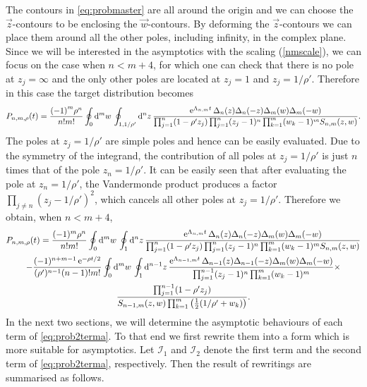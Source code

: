 \documentclass[cmp]{svjour}
\numberwithin{theorem}{section}
\numberwithin{equation}{section}
\DeclareMathOperator{\e}{e}
\def\dd{{\rm d}}
\begin{document}
The contours in \eqref{eq:probmaster} are all around the origin and we can choose the $\vec{z}$-contours to be enclosing the $\vec{w}$-contours. By deforming the $\vec{z}$-contours we can place them around all the other poles, including infinity, in the complex plane. Since we will be interested in the asymptotics with the scaling 
(\ref{nmscale}), we can focus on the case 
when $n<m+4$, for which one can check that there is no pole at $z_j=\infty$ and the only other poles are located at $z_j=1$ and $z_j=1/\rho'$. Therefore in this case 
the target distribution becomes
\begin{align*}
P_{n,m,\rho}(t)  =  \frac{ {(-1)}^m \rho^n  }{n!m!}\oint_{ 0} \dd^m w\,  \oint_{1,1/\rho'} \dd^nz\,  \frac{  \e^{\Lambda_{n,m} t} \Delta_n(z)  \Delta_n(-z)  \Delta_m(w) \Delta_m(-w)}  
{\prod_{j=1}^n (1- \rho' z_j)   \prod_{j=1}^n (z_j-1)^{n} \prod_{k=1}^m (w_k-1)^{m} S_{n,m}(z,w) }.
\end{align*}
%
The poles at $z_j=1/\rho'$ are simple poles and hence can be easily evaluated. Due to the symmetry of the integrand, the contribution of all poles at $z_j=1/\rho'$ is just $n$ times that of the pole $z_n=1/\rho'$. It can be easily seen that after evaluating the pole at $z_n=1/\rho'$, the Vandermonde product produces a factor $\prod_{j\neq n}(z_j-1/\rho')^2$, which cancels all other poles at $z_j=1/\rho'$. Therefore we obtain, when $n<m+4$, 
%
\begin{multline}
\label{eq:prob2terma}
P_{n,m,\rho}(t)  = \frac{ (-1)^m \rho^n  }{n!m!}\oint_{ 0} \dd^m w\,  \oint_{1} \dd^n z\,  \frac{ \e^{\Lambda_{n,m} t} \Delta_n(z) \Delta_n(-z) \Delta_m(w) \Delta_m(-w)} 
{  \prod_{j=1}^n (1- \rho' z_j) \prod_{j=1}^n (z_j-1)^{n} \prod_{k=1}^m (w_k-1)^{m} S_{n,m}(z,w) } \\
- \frac{  (-1)^{n+m-1}\e^{-\rho t/2}}{(\rho')^{n-1} (n-1)!m!}\oint_{ 0} \dd^m w\,  \oint_{1} \dd ^{n-1}z\,  \frac{ \e^{\Lambda_{n-1,m} t} \Delta_{n-1}(z) \Delta_{n-1}(-z) \Delta_m(w) \Delta_m(-w)} 
{ \prod_{j=1}^{n-1} (z_j-1)^{n} \prod_{k=1}^m (w_k-1)^{m} }\times \\
\frac{  \prod_{j=1}^{n-1}(1-\rho' z_j)}
{ S_{n-1,m}(z,w) \prod_{k=1}^m \big(\tfrac12( 1/\rho' + w_k)\big)}.
\end{multline}
%
In the next two sections, we will determine the asymptotic behaviours of each term of \eqref{eq:prob2terma}. To that end we first rewrite them into a form which is more suitable for asymptotics. 
Let $\mathcal{I}_1$ and $\mathcal{I}_2$ denote the first term and the second term of \eqref{eq:prob2terma}, respectively. Then the 
result of rewritings are summarised as follows.
\end{document}
